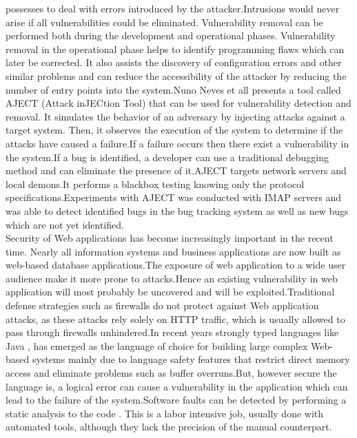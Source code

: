 possesses to deal with errors introduced by the attacker.Intrusions would never arise if all vulnerabilities could be eliminated. Vulnerability removal  \cite{7} can be performed both during the development and operational phases. Vulnerability removal in the operational phase helps to identify programming flaws which can later be corrected. It also assists
the discovery of configuration errors and other similar problems and can reduce the accessibility of the attacker by reducing the number of entry points into the system.Nuno Neves et all \cite{7}  presents a tool called AJECT (Attack inJECtion Tool) that can be used for vulnerability detection
and removal. It simulates the behavior of an adversary by injecting attacks against a target system. Then, it observes the execution of the system to determine if the attacks have caused a failure.If a failure occurs then there exist a vulnerability in the system.If a bug is identified, a developer can use a traditional debugging method and can eliminate the presence of it.AJECT targets network servers and local demons.It performs a blackbox testing knowing only the protocol specifications.Experiments with AJECT was conducted with IMAP servers and was able to detect identified bugs in the bug tracking system as well as new bugs which are not yet identified.\\
\newline
Security of Web applications has become increasingly
important in the recent time. Nearly all information systems and business
applications  are now built as web-based
database applications.The exposure of web application to a wide user audience make it more prone to attacks.Hence an existing vulnerability in web application will most probably be uncovered and will be exploited.Traditional defense strategies such as firewalls do not protect against Web application attacks, as these attacks rely
solely on HTTP traffic, which is usually allowed to pass
through firewalls unhindered.In recent years strongly typed languages like Java \cite{10}, has emerged as the language of choice for building large complex Web-based systems mainly due to language safety features that restrict direct memory access and eliminate problems such as buffer overruns.But, however secure the language is, a logical error can cause a vulnerability in the application which can lead to the failure of the system.Software faults can be detected by performing a static analysis to the code \cite{10}. This is a labor intensive job, usually done with automated tools, although they lack the precision of the manual counterpart.\\

